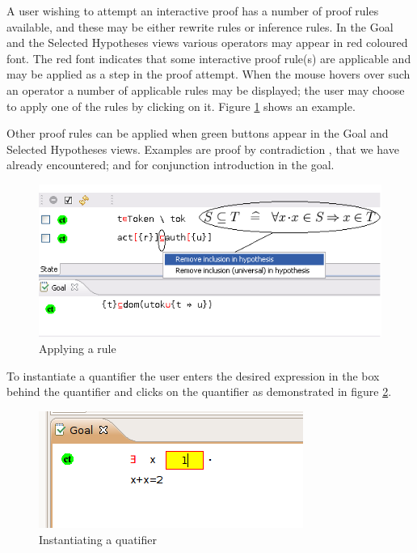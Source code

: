 A user wishing to attempt an interactive proof has a number of proof rules available, and these may be either rewrite rules or inference rules. In the \textsf{Goal} and the \textsf{Selected Hypotheses} views various operators may appear in red coloured font. The red font indicates that some interactive proof rule(s) are applicable and may be applied as a step in the proof attempt. When the mouse hovers over such an operator a number of applicable rules may be displayed; the user may choose to apply one of the rules by clicking on it. Figure \ref{fig_ref_01_proving_perspective4} shows an example.

Other proof rules can be applied when green buttons appear in the \textsf{Goal} and \textsf{Selected Hypotheses} views. Examples are proof by contradiction , that we have already encountered; and  for conjunction introduction in the goal. 

\begin{figure}[!h]
\begin{center}
	\includegraphics{img/reference/ref_01_proving_perspective4.png}
	\caption{Applying a rule}
	\label{fig_ref_01_proving_perspective4}
\end{center}
\end{figure}

To instantiate a quantifier the user enters the desired expression in the box behind the quantifier and clicks on the quantifier as demonstrated in figure \ref{fig_ref_01_proving_perspective5}.

\begin{figure}[!h]
\begin{center}
	\includegraphics{img/reference/ref_01_proving_perspective5.png}
	\caption{Instantiating a quatifier}
	\label{fig_ref_01_proving_perspective5}
\end{center}
\end{figure}

